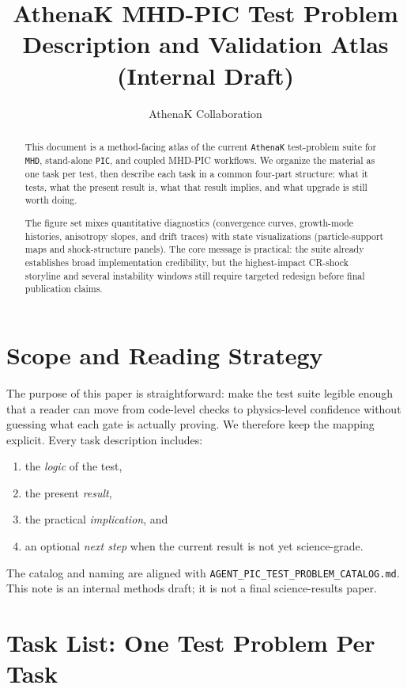 \documentclass[twocolumn]{aastex701}
\newcommand{\athenak}{\texttt{AthenaK}\xspace}
\newcommand{\pic}{\texttt{PIC}\xspace}
\newcommand{\mhd}{\texttt{MHD}\xspace}
\begin{document}
\title{AthenaK MHD-PIC Test Problem Description and Validation Atlas (Internal Draft)}

\author{AthenaK Collaboration}

\begin{abstract}
This document is a method-facing atlas of the current \athenak test-problem
suite for \mhd, stand-alone \pic, and coupled MHD-PIC workflows. We organize
the material as one task per test, then describe each task in a common four-part
structure: what it tests, what the present result is, what that result implies,
and what upgrade is still worth doing.

The figure set mixes quantitative diagnostics (convergence curves, growth-mode
histories, anisotropy slopes, and drift traces) with state visualizations
(particle-support maps and shock-structure panels). The core message is
practical: the suite already establishes broad implementation credibility, but
the highest-impact CR-shock storyline and several instability windows still
require targeted redesign before final publication claims.
\end{abstract}

\section{Scope and Reading Strategy}

The purpose of this paper is straightforward: make the test suite legible enough
that a reader can move from code-level checks to physics-level confidence
without guessing what each gate is actually proving. We therefore keep the
mapping explicit. Every task description includes:
\begin{enumerate}
\item the \textit{logic} of the test,
\item the present \textit{result},
\item the practical \textit{implication}, and
\item an optional \textit{next step} when the current result is not yet
science-grade.
\end{enumerate}

The catalog and naming are aligned with
\texttt{AGENT\_PIC\_TEST\_PROBLEM\_CATALOG.md}. This note is an internal
methods draft; it is not a final science-results paper.

\section{Task List: One Test Problem Per Task}
\end{document}
